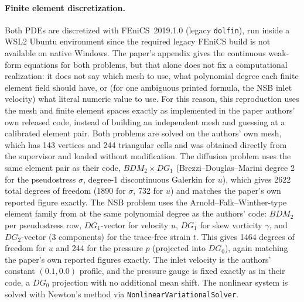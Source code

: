 \paragraph{Finite element discretization.} Both PDEs are discretized with
FEniCS~2019.1.0 (legacy \texttt{dolfin}), run inside a WSL2 Ubuntu
environment since the required legacy FEniCS build is not available on
native Windows. The paper's appendix gives the continuous weak-form
equations for both problems, but that alone does not fix a computational
realization: it does not say which mesh to use, what polynomial degree
each finite element field should have, or (for one ambiguous printed
formula, the NSB inlet velocity) what literal numeric value to use. For
this reason, this reproduction uses the mesh and finite element spaces
exactly as implemented in the paper authors' own released code, instead of
building an independent mesh and guessing at a calibrated element pair.
Both problems are solved on the authors' own mesh, which has 143 vertices
and 244 triangular cells and was obtained directly from the supervisor and
loaded without modification. The diffusion problem uses the same element
pair as their code, $BDM_2 \times DG_1$ \cite{brezzidouglasmarini1985}
(Brezzi--Douglas--Marini degree 2 for the pseudostress $\sigma$, degree-1
discontinuous Galerkin for $u$), which gives 2622 total degrees of freedom
(1890 for $\sigma$, 732 for $u$) and matches the paper's own reported
figure exactly. The NSB problem uses the Arnold--Falk--Winther-type
element family \cite{arnoldfalkwinther2007} from \cite{gatica2022nsb} at
the same polynomial degree as the authors' code: $BDM_2$ per pseudostress
row, $DG_1$-vector for velocity $u$, $DG_1$ for skew vorticity $\gamma$,
and $DG_2$-vector (3 components) for the trace-free strain $t$. This gives
1464 degrees of freedom for $u$ and 244 for the pressure $p$ (projected
into $DG_0$), again matching the paper's own reported figures exactly. The
inlet velocity is the authors' constant $(0.1, 0.0)$ profile, and the
pressure gauge is fixed exactly as in their code, a $DG_0$ projection with
no additional mean shift. The nonlinear system is solved with Newton's
method via \texttt{NonlinearVariationalSolver}.

